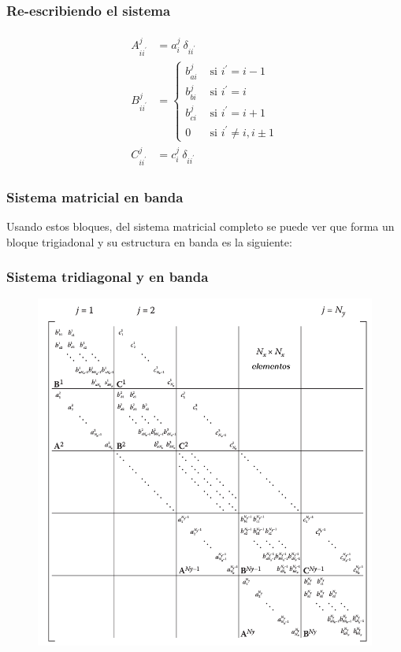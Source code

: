 \documentclass[12pt]{beamer}
\begin{document}
\begin{frame}
\frametitle{Re-escribiendo el sistema}
\begin{align}
\begin{aligned}
A_{ii^{\prime}}^{j} &= a_{i}^{j} \: \delta_{ii^{\prime}} \\
B_{ii^{\prime}}^{j} &= \begin{cases}
b_{ai}^{j} & \mbox{ si } i^{\prime} = i-1 \\
b_{bi}^{j} & \mbox{ si } i^{\prime} = i \\
b_{ci}^{j} & \mbox{ si } i^{\prime} = i+1 \\
0 & \mbox{ si } i^{\prime} \neq i, i \pm 1 \end{cases} \\
C_{ii^{\prime}}^{j} &= c_{i}^{j} \: \delta_{ii^{\prime}}
\end{aligned}
\label{eq:ecuacion:13_16}
\end{align}
\end{frame}
\begin{frame}
\frametitle{Sistema matricial en banda}
Usando estos bloques, del sistema matricial completo se puede ver que forma un bloque trigiadonal y su estructura en banda es la siguiente:
\end{frame}
{
\begin{frame}
\frametitle{Sistema tridiagonal y en banda}
\begin{figure}
    \centering
    \includegraphics[scale=0.21]{Imagenes/Sistema_Matricial_Completo.png}
\end{figure}    
\end{frame}
}
\end{document}
